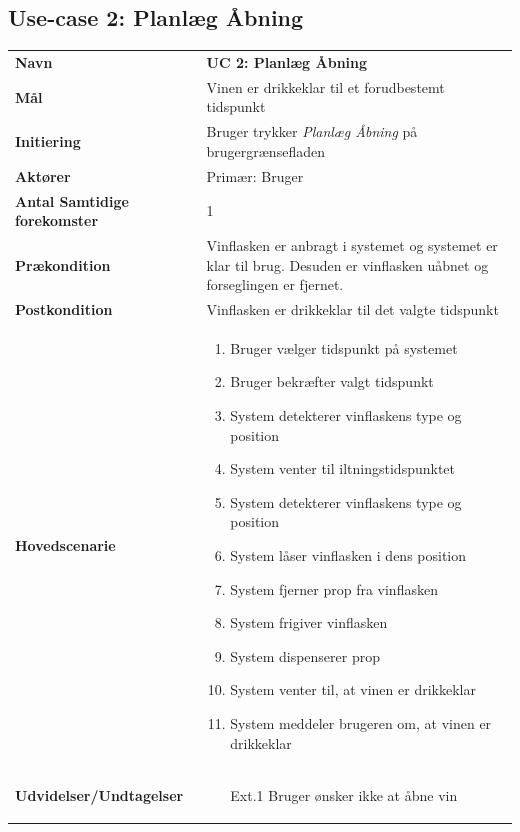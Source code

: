 \subsection{Use-case 2: Planlæg Åbning}
\begin{longtable}{>{\bfseries}p{100pt} p{300pt}}
	
	Navn & \bfseries{UC 2: Planlæg Åbning} \\
	Mål & Vinen er drikkeklar til et forudbestemt tidspunkt\\
	Initiering & Bruger trykker \emph{Planlæg Åbning} på brugergrænsefladen\\
	Aktører & Primær: Bruger \\
	Antal Samtidige forekomster & 1 \\
	Prækondition & Vinflasken er anbragt i systemet og systemet er klar til brug. Desuden er vinflasken uåbnet og forseglingen er fjernet. \\
	Postkondition & Vinflasken er drikkeklar til det valgte tidspunkt\\
	Hovedscenarie & \begin{enumerate}
		\item Bruger vælger tidspunkt på systemet
		\subitem [Ext. 1: Bruger ønsker ikke at åbne vin] 
		\item Bruger bekræfter valgt tidspunkt
		\subitem [Ext. 2: Vinen kan ikke iltes korrekt til det valgte tidspunkt]
		\item System detekterer vinflaskens type og position
		\subitem [Ext. 3: System registrerer ugyldig type af vinflaske]
		\subitem [Ext. 4: System kan ikke registrere en vinflaske]
		\item System venter til iltningstidspunktet
		\subitem [Ext. 5: Bruger annullerer planlagt åbning af vin]
		\item System detekterer vinflaskens type og position
		\subitem [Ext. 3: System registrerer ugyldig type af vinflaske]
		\subitem [Ext. 4: System kan ikke registrere en vinflaske]
		\item System låser vinflasken i dens position
		\item System fjerner prop fra vinflasken
		\item System frigiver vinflasken
		\item System dispenserer prop
		\item System venter til, at vinen er drikkeklar
		\item System meddeler brugeren om, at vinen er drikkeklar		
	\end{enumerate} \\
	Udvidelser/Undtagelser & 
	\begin{enumerate}
		\item[Ext.1] Bruger ønsker ikke at åbne vin
		

\end{enumerate}
\end{longtable}
